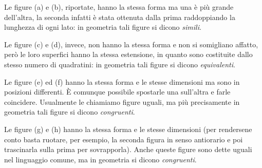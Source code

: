 \begin{minipage}{.49 \textwidth}
\begin{inaccessibleblock}
\begin{center}
\scalebox{.8}{}
\scalebox{.8}{}
\end{center}
\end{inaccessibleblock}
\end{minipage}
\hfil
\begin{minipage}{.49 \textwidth}
Le figure (a) e (b), riportate, hanno la stessa forma ma una è 
più grande dell'altra, la seconda infatti è stata ottenuta dalla 
prima raddoppiando la lunghezza di ogni lato: in geometria tali 
figure si dicono \emph{simili}.

Le figure (c) e (d), invece, non hanno la stessa forma e non si 
somigliano affatto, però le loro superfici hanno la stessa 
estensione, in quanto sono costituite dallo stesso numero di 
quadratini: in geometria tali figure si dicono \emph{equivalenti}.
\end{minipage}


\begin{minipage}{.49 \textwidth}
Le figure (e) ed (f) hanno la stessa forma e le stesse dimensioni ma 
sono in posizioni differenti. \`E comunque possibile spostarle una 
sull'altra e farle coincidere. Usualmente le chiamiamo figure uguali, 
ma più precisamente in geometria tali figure si dicono 
\emph{congruenti}.

Le figure (g) e (h) hanno la stessa forma e le stesse dimensioni (per 
rendersene conto basta ruotare, per esempio, la seconda figura in 
senso antiorario e poi trascinarla sulla prima per sovrapporla). 
Anche queste figure sono dette uguali nel linguaggio comune, ma in 
geometria si dicono \emph{congruenti}.
\end{minipage}
\hfil
\begin{minipage}{.49 \textwidth}
\begin{inaccessibleblock}
\begin{center}
\scalebox{.8}{}
\scalebox{.8}{}
\end{center}
\end{inaccessibleblock}
\end{minipage}

